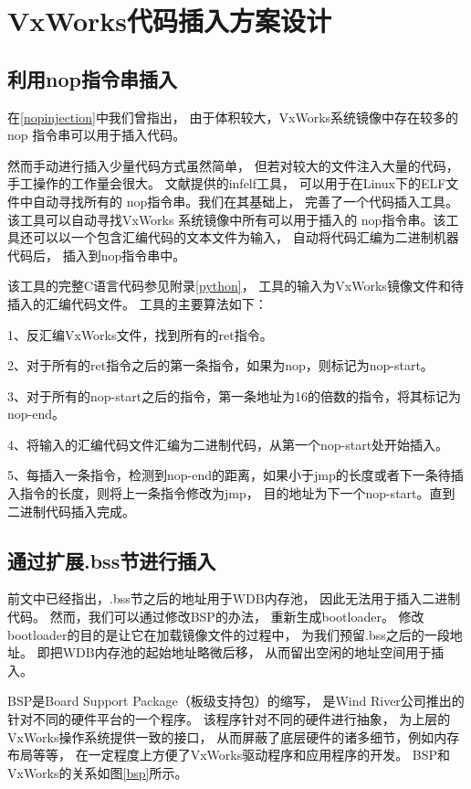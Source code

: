 
\section{VxWorks代码插入方案设计}

\subsection{利用nop指令串插入}

在\ref{nopinjection}中我们曾指出，
由于体积较大，VxWorks系统镜像中存在较多的nop
指令串可以用于插入代码。

然而手动进行插入少量代码方式虽然简单，
但若对较大的文件注入大量的代码，
手工操作的工作量会很大。
文献\cite{infelf}提供的infelf工具，
可以用于在Linux下的ELF文件中自动寻找所有的
nop指令串。我们在其基础上，
完善了一个代码插入工具。
该工具可以自动寻找VxWorks
系统镜像中所有可以用于插入的
nop指令串。该工具还可以以一个包含汇编代码的文本文件为输入，
自动将代码汇编为二进制机器代码后，
插入到nop指令串中。

该工具的完整C语言代码参见附录\ref{python}，
工具的输入为VxWorks镜像文件和待插入的汇编代码文件。
工具的主要算法如下：

1、反汇编VxWorks文件，找到所有的ret指令。

2、对于所有的ret指令之后的第一条指令，如果为nop，则标记为nop-start。

3、对于所有的nop-start之后的指令，第一条地址为16的倍数的指令，将其标记为nop-end。

4、将输入的汇编代码文件汇编为二进制代码，从第一个nop-start处开始插入。

5、每插入一条指令，检测到nop-end的距离，如果小于jmp的长度或者下一条待插入指令的长度，则将上一条指令修改为jmp，
目的地址为下一个nop-start。直到二进制代码插入完成。



\subsection{通过扩展.bss节进行插入}

前文中已经指出，.bss节之后的地址用于WDB内存池，
因此无法用于插入二进制代码。
然而，我们可以通过修改BSP的办法，
重新生成bootloader。
修改bootloader的目的是让它在加载镜像文件的过程中，
为我们预留.bss之后的一段地址。
即把WDB内存池的起始地址略微后移，
从而留出空闲的地址空间用于插入。

BSP是Board Support Package（板级支持包）的缩写，
是Wind River公司推出的针对不同的硬件平台的一个程序。
该程序针对不同的硬件进行抽象，
为上层的VxWorks操作系统提供一致的接口，
从而屏蔽了底层硬件的诸多细节，例如内存布局等等，
在一定程度上方便了VxWorks驱动程序和应用程序的开发。
BSP和VxWorks的关系如图\ref{bsp}所示。


